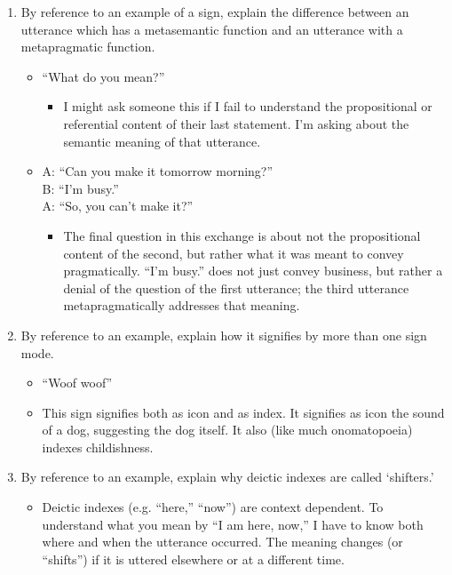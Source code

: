 \documentclass[man,12pt]{apa6}
\providecommand{\tightlist}{%
  \setlength{\itemsep}{0pt}\setlength{\parskip}{0pt}}
\begin{document}
\begin{enumerate}
\def\labelenumi{\arabic{enumi}.}
\setcounter{enumi}{1}
\tightlist
\item
  By reference to an example of a sign, explain the difference between
  an utterance which has a metasemantic function and an utterance with a
  metapragmatic function.

  \begin{itemize}
  \tightlist
  \item
    ``What do you mean?''

    \begin{itemize}
    \tightlist
    \item
      I might ask someone this if I fail to understand the propositional
      or referential content of their last statement. I'm asking about
      the semantic meaning of that utterance.
    \end{itemize}
  \item
    A: ``Can you make it tomorrow morning?''\\
     B: ``I'm busy.''\\
     A: ``So, you can't make it?''

    \begin{itemize}
    \tightlist
    \item
      The final question in this exchange is about not the propositional
      content of the second, but rather what it was meant to convey
      pragmatically. ``I'm busy.'' does not just convey business, but
      rather a denial of the question of the first utterance; the third
      utterance metapragmatically addresses that meaning.
    \end{itemize}
  \end{itemize}
\item
  By reference to an example, explain how it signifies by more than one
  sign mode.

  \begin{itemize}
  \tightlist
  \item
    ``Woof woof''
  \item
    This sign signifies both as icon and as index. It signifies as icon
    the sound of a dog, suggesting the dog itself. It also (like much
    onomatopoeia) indexes childishness.
  \end{itemize}
\item
  By reference to an example, explain why deictic indexes are called
  `shifters.'

  \begin{itemize}
  \tightlist
  \item
    Deictic indexes (e.g. ``here,'' ``now'') are context dependent. To
    understand what you mean by ``I am here, now,'' I have to know both
    where and when the utterance occurred. The meaning changes (or
    ``shifts'') if it is uttered elsewhere or at a different time.
  \end{itemize}


\end{enumerate}
\end{document}
